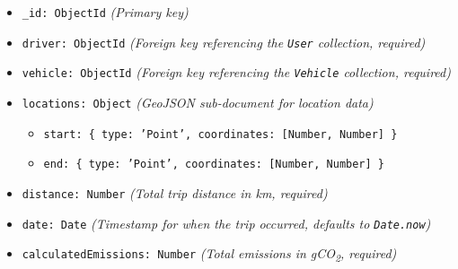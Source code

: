 \begin{itemize}
    \item \texttt{\_id: ObjectId} \textit{(Primary key)}
    \item \texttt{driver: ObjectId} \textit{(Foreign key referencing the \texttt{User} collection, required)}
    \item \texttt{vehicle: ObjectId} \textit{(Foreign key referencing the \texttt{Vehicle} collection, required)}
    \item \texttt{locations: Object} \textit{(GeoJSON sub-document for location data)}
        \begin{itemize}
            \item \texttt{start: \{ type: 'Point', coordinates: [Number, Number] \}}
            \item \texttt{end: \{ type: 'Point', coordinates: [Number, Number] \}}
        \end{itemize}
    \item \texttt{distance: Number} \textit{(Total trip distance in km, required)}
    \item \texttt{date: Date} \textit{(Timestamp for when the trip occurred, defaults to \texttt{Date.now})}
    \item \texttt{calculatedEmissions: Number} \textit{(Total emissions in gCO\textsubscript{2}, required)}
\end{itemize}
